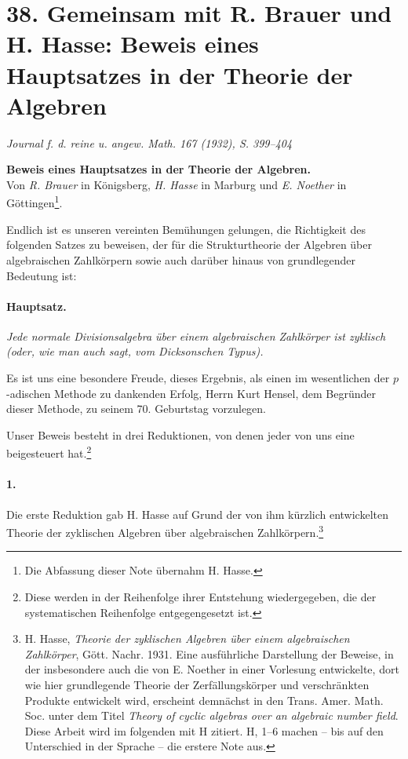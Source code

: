 \section*{38. Gemeinsam mit R. Brauer und H. Hasse: Beweis eines Hauptsatzes in der Theorie der Algebren}

\begin{center}
\emph{Journal f. d. reine u. angew. Math. 167 (1932), S. 399--404}
\end{center}

\begin{center}
\textbf{Beweis eines Hauptsatzes in der Theorie der Algebren.}\\[0.5em]
Von \emph{R. Brauer} in Königsberg, \emph{H. Hasse} in Marburg und \emph{E. Noether} in Göttingen\footnote{Die Abfassung dieser Note übernahm H. Hasse.}.
\end{center}

Endlich ist es unseren vereinten Bemühungen gelungen, die Richtigkeit des folgenden Satzes zu beweisen, der für die Strukturtheorie der Algebren über algebraischen Zahlkörpern sowie auch darüber hinaus von grundlegender Bedeutung ist:

\paragraph{Hauptsatz.}
\emph{Jede normale Divisionsalgebra über einem algebraischen Zahlkörper ist zyklisch (oder, wie man auch sagt, vom Dicksonschen Typus).}

Es ist uns eine besondere Freude, dieses Ergebnis, als einen im wesentlichen der \(p\)-adischen Methode zu dankenden Erfolg, Herrn Kurt Hensel, dem Begründer dieser Methode, zu seinem 70. Geburtstag vorzulegen.

Unser Beweis besteht in drei Reduktionen, von denen jeder von uns eine beigesteuert hat.\footnote{Diese werden in der Reihenfolge ihrer Entstehung wiedergegeben, die der systematischen Reihenfolge entgegengesetzt ist.}

\paragraph{1.}
Die erste Reduktion gab H. Hasse auf Grund der von ihm kürzlich entwickelten Theorie der zyklischen Algebren über algebraischen Zahlkörpern.\footnote{H. Hasse, \emph{Theorie der zyklischen Algebren über einem algebraischen Zahlkörper}, Gött. Nachr. 1931. Eine ausführliche Darstellung der Beweise, in der insbesondere auch die von E. Noether in einer Vorlesung entwickelte, dort wie hier grundlegende Theorie der Zerfällungskörper und verschränkten Produkte entwickelt wird, erscheint demnächst in den Trans. Amer. Math. Soc. unter dem Titel \emph{Theory of cyclic algebras over an algebraic number field}. Diese Arbeit wird im folgenden mit H zitiert. H, 1--6 machen -- bis auf den Unterschied in der Sprache -- die erstere Note aus.}

